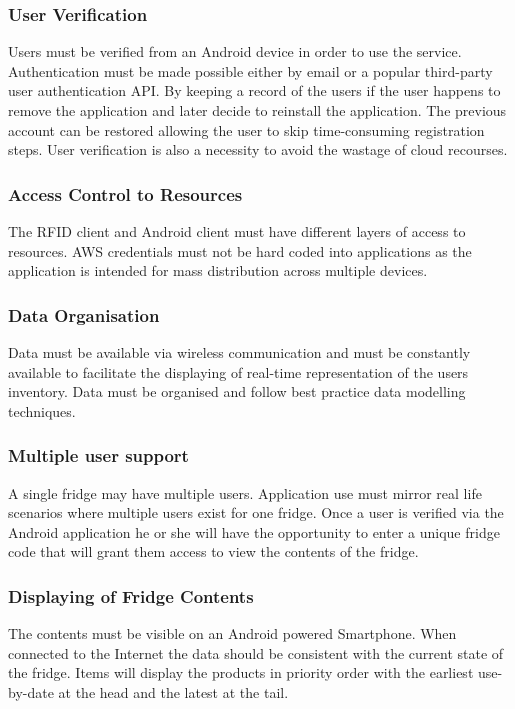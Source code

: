 \documentclass[a4paper, 11pt]{article}
\begin{document}
\subsubsection{User Verification}
Users must be verified from an Android device in order to use the service. Authentication must be made possible either by email or a popular third-party user authentication API. By keeping a record of the users if the user happens to remove the application and later decide to reinstall the application. The previous account can be restored allowing the user to skip time-consuming registration steps. User verification is also a necessity to avoid the wastage of cloud recourses.
\subsubsection{Access Control to Resources}
The RFID client and Android client must have different layers of access to resources. AWS credentials must not be hard coded into applications as the application is intended for mass distribution across multiple devices.

\subsubsection{Data Organisation}
Data must be available via wireless communication and must be constantly available to facilitate the displaying of real-time representation of the users inventory. Data must be organised and follow best practice data modelling techniques. 

\subsubsection{Multiple user support}
A single fridge may have multiple users. Application use must mirror real life scenarios where multiple users exist for one fridge. Once a user is verified via the Android application he or she will have the opportunity to enter a unique fridge code that will grant them access to view the contents of the fridge. 

\subsubsection{Displaying of Fridge Contents}
The contents must be visible on an Android powered Smartphone. When connected to the Internet the data should be consistent with the current state of the fridge. Items will display the products in priority order with the earliest use-by-date at the head and the latest at the tail. 
\end{document}
